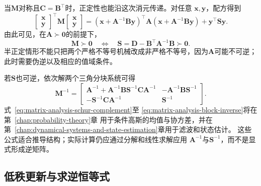 当$\bm{M}$对称且$\bm{C}=\bm{B}^{\top}$时，正定性也能沿这次消元传递。对任意
$\bm{x},\bm{y}$，配方得到
\[
  \begin{bmatrix}\bm{x}\\\bm{y}\end{bmatrix}^{\top}
  \bm{M}
  \begin{bmatrix}\bm{x}\\\bm{y}\end{bmatrix}
  =
  (\bm{x}+\bm{A}^{-1}\bm{B}\bm{y})^{\top}
  \bm{A}
  (\bm{x}+\bm{A}^{-1}\bm{B}\bm{y})
  +\bm{y}^{\top}\bm{S}\bm{y}.
\]
由此可见，在$\bm{A}\succ\bm{0}$的前提下，
\begin{equation}
  \bm{M}\succ\bm{0}
  \quad\Longleftrightarrow\quad
  \bm{S}=\bm{D}-\bm{B}^{\top}\bm{A}^{-1}\bm{B}
  \succ\bm{0}.
  \label{eq:matrix-analysis-schur-positive-definite}
\end{equation}
半正定情形不能只把两个严格不等号机械改成非严格不等号，因为$\bm{A}$可能不可逆；
此时需要伪逆以及相应的值域条件。

若$\bm{S}$也可逆，依次解两个三角分块系统可得
\begin{equation}
  \bm{M}^{-1}
  =
  \begin{bmatrix}
    \bm{A}^{-1}+\bm{A}^{-1}\bm{B}\bm{S}^{-1}
      \bm{C}\bm{A}^{-1}
    &-\bm{A}^{-1}\bm{B}\bm{S}^{-1}\\
    -\bm{S}^{-1}\bm{C}\bm{A}^{-1}
    &\bm{S}^{-1}
  \end{bmatrix}.
  \label{eq:matrix-analysis-block-inverse}
\end{equation}
式~\eqref{eq:matrix-analysis-schur-complement}至
\eqref{eq:matrix-analysis-block-inverse}将在第~\ref{chap:probability-theory}章
用于条件高斯的均值与协方差，并在
第~\ref{chap:dynamical-systems-and-state-estimation}章用于滤波和状态估计。
这些公式适合推导结构；实际计算仍应通过分解和线性求解应用
$\bm{A}^{-1}$与$\bm{S}^{-1}$，而不是显式形成逆矩阵。

\subsection{低秩更新与求逆恒等式}

